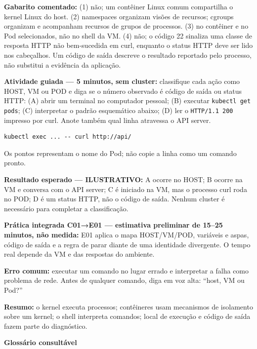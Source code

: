 \documentclass[12pt,openany,oneside,a4paper,chapter=TITLE,english,brazil]{abntex2}
\begin{document}
\textbf{Gabarito comentado:} (1) não; um contêiner Linux comum compartilha o kernel Linux do host. (2) namespaces organizam visões de recursos; cgroups organizam e acompanham recursos de grupos de processos. (3) no contêiner e no Pod selecionados, não no shell da VM. (4) não; o código 22 sinaliza uma classe de resposta HTTP não bem-sucedida em curl, enquanto o status HTTP deve ser lido nos cabeçalhos. Um código de saída descreve o resultado reportado pelo processo, não substitui a evidência da aplicação.

\textbf{Atividade guiada --- 5 minutos, sem cluster:} classifique cada ação como HOST, VM ou POD e diga se o número observado é código de saída ou status HTTP: (A) abrir um terminal no computador pessoal; (B) executar \texttt{kubectl get pods}; (C) interpretar o padrão esquemático abaixo; (D) ler o \texttt{HTTP/\allowbreak{}1.\allowbreak{}1 200} impresso por curl. Anote também qual linha atravessa o API server.

\begin{verbatim}
kubectl exec ... -- curl http://api/
\end{verbatim}

Os pontos representam o nome do Pod; não copie a linha como um comando pronto.

\textbf{Resultado esperado --- ILUSTRATIVO:} A ocorre no HOST; B ocorre na VM e conversa com o API server; C é iniciado na VM, mas o processo curl roda no POD; D é um status HTTP, não o código de saída. Nenhum cluster é necessário para completar a classificação.

\textbf{Prática integrada C01→E01 --- estimativa preliminar de 15--25 minutos, não medida:} E01 aplica o mapa HOST/VM/POD, variáveis e aspas, código de saída e a regra de parar diante de uma identidade divergente. O tempo real depende da VM e das respostas do ambiente.

\textbf{Erro comum:} executar um comando no lugar errado e interpretar a falha como problema de rede. Antes de qualquer comando, diga em voz alta: ``host, VM ou Pod?''

\textbf{Resumo:} o kernel executa processos; contêineres usam mecanismos de isolamento sobre um kernel; o shell interpreta comandos; local de execução e código de saída fazem parte do diagnóstico.

\textbf{Glossário consultável}
\end{document}
